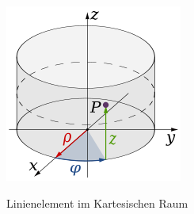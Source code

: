 

\begin{figure}
	\centering
	\includegraphics[width=0.7\linewidth]{papers/geodaeten/Abbildungen/Linienelemente/LinZyl1}
	\caption{Linienelement im Kartesischen Raum}
	\label{geodaeten:Linienelemente:figure2}
	\cite{geodaeten:polarkoordinaten}
\end{figure}

